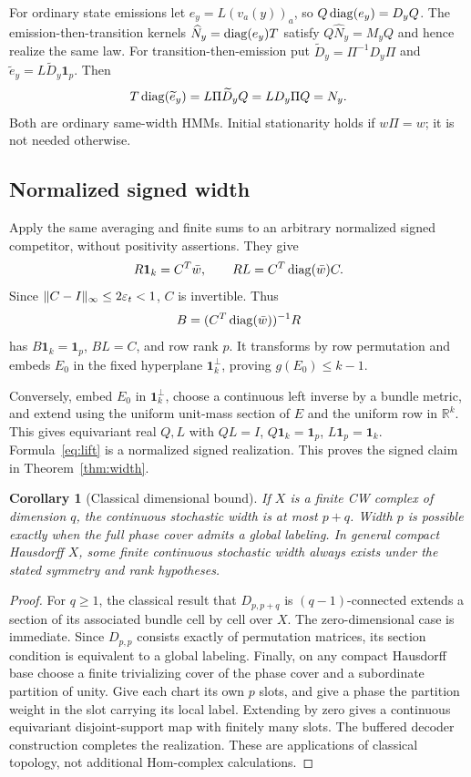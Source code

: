 \documentclass[11pt]{article}
\newtheorem{corollary}[theorem]{Corollary}
\theoremstyle{remark}\newtheorem{remark}[theorem]{Remark}
\newcommand{\R}{\mathbb R}\newcommand{\one}{\mathbf1}
\begin{document}
For ordinary state emissions let $e_y=L(v_a(y))_a$, so $Q\operatorname{diag}(e_y)=D_yQ$. The emission-then-transition kernels $\widehat N_y=\operatorname{diag}(e_y)T$ satisfy $Q\widehat N_y=M_yQ$ and hence realize the same law. For transition-then-emission put $\widetilde D_y=\Pi^{-1}D_y\Pi$ and $\widetilde e_y=L\widetilde D_y\one_p$. Then
\[
T\operatorname{diag}(\widetilde e_y)=L\Pi\widetilde D_yQ=LD_y\Pi Q=N_y.
\]
Both are ordinary same-width HMMs. Initial stationarity holds if $w\Pi=w$; it is not needed otherwise.

\subsection{Normalized signed width}
Apply the same averaging and finite sums to an arbitrary normalized signed competitor, without positivity assertions. They give
\[
R\one_k=C^T\bar w,\qquad RL=C^T\diag(\bar w)C.
\]
Since $\|C-I\|_\infty\leq2\varepsilon_t<1$, $C$ is invertible. Thus
\[
B=(C^T\operatorname{diag}(\bar w))^{-1}R
\]
has $B\one_k=\one_p$, $BL=C$, and row rank $p$. It transforms by row permutation and embeds $E_0$ in the fixed hyperplane $\one_k^\perp$, proving $g(E_0)\leq k-1$.

Conversely, embed $E_0$ in $\one_k^\perp$, choose a continuous left inverse by a bundle metric, and extend using the uniform unit-mass section of $E$ and the uniform row in $\R^k$. This gives equivariant real $Q,L$ with $QL=I$, $Q\one_k=\one_p$, $L\one_p=\one_k$. Formula~\eqref{eq:lift} is a normalized signed realization. This proves the signed claim in Theorem~\ref{thm:width}.

\begin{corollary}[Classical dimensional bound]
If $X$ is a finite CW complex of dimension $q$, the continuous stochastic width is at most $p+q$. Width $p$ is possible exactly when the full phase cover admits a global labeling. In general compact Hausdorff $X$, some finite continuous stochastic width always exists under the stated symmetry and rank hypotheses.
\end{corollary}
\begin{proof}
For $q\geq1$, the classical result that $D_{p,p+q}$ is $(q-1)$-connected \cite{BK,AGH} extends a section of its associated bundle cell by cell over $X$. The zero-dimensional case is immediate. Since $D_{p,p}$ consists exactly of permutation matrices, its section condition is equivalent to a global labeling. Finally, on any compact Hausdorff base choose a finite trivializing cover of the phase cover and a subordinate partition of unity. Give each chart its own $p$ slots, and give a phase the partition weight in the slot carrying its local label. Extending by zero gives a continuous equivariant disjoint-support map with finitely many slots. The buffered decoder construction completes the realization. These are applications of classical topology, not additional Hom-complex calculations.
\end{proof}
\end{document}
